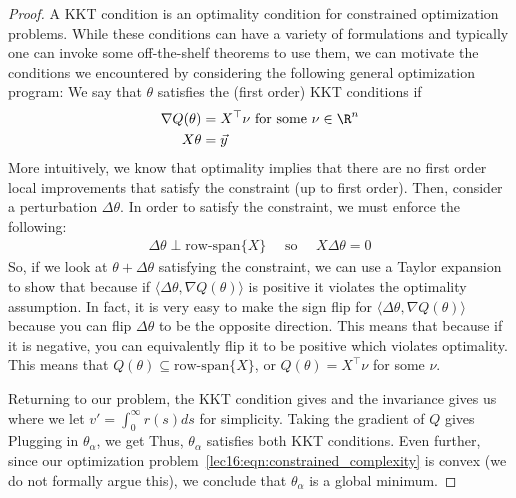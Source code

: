\begin{proof}
A KKT condition is an optimality condition for constrained optimization problems. While these conditions can have a variety of formulations and typically one can invoke some off-the-shelf theorems to use them, we can motivate the conditions we encountered by considering the following general optimization program:
We say that $\theta$ satisfies the (first order) KKT conditions if
\begin{align}
    \nabla Q(\theta) &= X^\top \nu \text{ for some } \nu \in \R^n \\
    X\theta &= \vec{y}
\end{align}
More intuitively, we know that optimality implies that there are no first order local improvements that satisfy the constraint (up to first order). Then, consider a perturbation $\Delta \theta$. In order to satisfy the constraint, we must enforce the following:
\begin{align}
\Delta \theta \perp \text{row-span}\{X\}  \quad \text{ so } \quad X \Delta \theta = 0
\end{align}
So, if we look at $\theta + \Delta \theta $ satisfying the constraint, we can use a Taylor expansion to show that
because if $ \langle \Delta \theta, \nabla Q(\theta) \rangle$ is positive it violates the optimality assumption.
In fact, it is very easy to make the sign flip for $ \langle \Delta \theta, \nabla Q(\theta) \rangle$ because you can flip $\Delta \theta$ to be the opposite direction. This means that
because if it is negative, you can equivalently flip it to be positive which violates optimality.
This means that $Q(\theta) \subseteq \text{row-span}\{X\}$, or $Q(\theta) = X^\top \nu$ for some $\nu$.

Returning to our problem, the KKT condition gives
and the invariance gives us
where we let $v' = \int_0^\infty r(s) ds$ for simplicity.
Taking the gradient of $Q$ gives
Plugging in $\theta_\alpha$, we get
Thus, $\theta_\alpha$ satisfies both KKT conditions. Even further, since our optimization problem~\eqref{lec16:eqn:constrained_complexity} is convex (we do not formally argue this), we conclude that $\theta_\alpha$ is a global minimum.
\end{proof}

